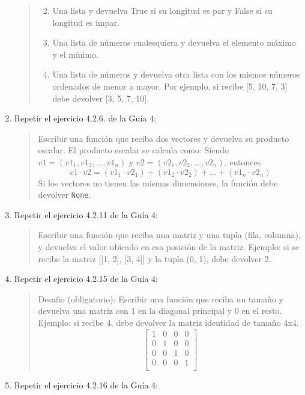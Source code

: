 \documentclass[
  letterpaper,
  DIV=11,
  numbers=noendperiod]{scrreprt}
\providecommand{\tightlist}{%
  \setlength{\itemsep}{0pt}\setlength{\parskip}{0pt}}\usepackage{longtable,booktabs,array}
\begin{document}
\begin{enumerate}
\begin{quote}
  \begin{enumerate}
  \def\labelenumii{\alph{enumii}.}
  \tightlist
  \item
    Una lista y devuelva True si su longitud es par y False si su
    longitud es impar.\\
  \item
    Una lista de números cualesquiera y devuelva el elemento máximo y el
    mínimo.\\
  \item
    Una lista de números y devuelva otra lista con los mismos números
    ordenados de menor a mayor. Por ejemplo, si recibe {[}5, 10, 7, 3{]}
    debe devolver {[}3, 5, 7, 10{]}.
  \end{enumerate}
  \end{quote}
\item
  Repetir el ejercicio 4.2.6. de la Guía 4:

  \begin{quote}
  Escribir una función que reciba dos vectores y devuelva su producto
  escalar. El producto escalar se calcula como: Siendo
  \(v1 = (v1_1, v1_2, ..., v1_n)\) y \(v2 = (v2_1, v2_2, ..., v2_n)\),
  entonces\\
  \[v1 \cdot v2 = (v1_1 \cdot v2_1) + (v1_2 \cdot v2_2) + ... + (v1_n \cdot v2_n)\]
  Si los vectores no tienen las mismas dimensiones, la función debe
  devolver \texttt{None}.
  \end{quote}
\item
  Repetir el ejercicio 4.2.11 de la Guía 4:

  \begin{quote}
  Escribir una función que reciba una matriz y una tupla (fila,
  columna), y devuelva el valor ubicado en esa posición de la matriz.
  Ejemplo: si se recibe la matriz {[}{[}1, 2{]}, {[}3, 4{]}{]} y la
  tupla (0, 1), debe devolver 2.
  \end{quote}
\item
  Repetir el ejercicio 4.2.15 de la Guía 4:

  \begin{quote}
  Desafio (obligatorio): Escribir una función que reciba un tamaño y
  devuelva una matriz con 1 en la diagonal principal y 0 en el resto.
  Ejemplo: si recibe 4, debe devolver la matriz identidad de tamaño
  4x4.\\
  \[
  \begin{bmatrix}
  1 & 0 & 0 & 0 \\
  0 & 1 & 0 & 0 \\
  0 & 0 & 1 & 0 \\
  0 & 0 & 0 & 1 \\
  \end{bmatrix}
  \]
  \end{quote}
\item
  Repetir el ejercicio 4.2.16 de la Guía 4:


\end{enumerate}
\end{document}
